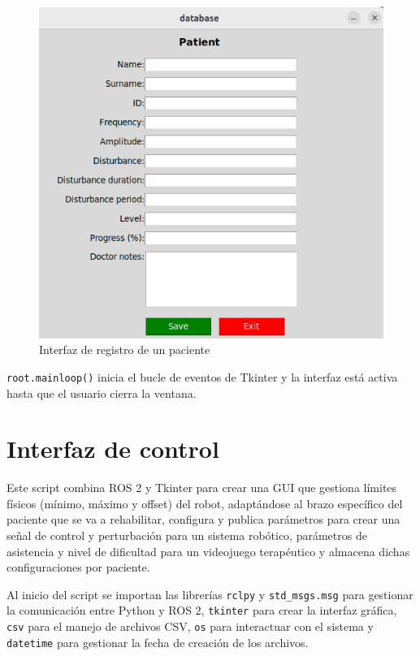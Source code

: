 \begin{figure}[ht!]
	\centering
	\begin{minipage}{0.65\linewidth}
		\centering
		\includegraphics[width=\linewidth]{figs/registro.png}
	\end{minipage}
	\caption[Interfaz de registro de un paciente]{Interfaz de registro de un paciente}
	\label{fig:database}
\end{figure}

\verb|root.mainloop()| inicia el bucle de eventos de Tkinter y la interfaz está activa hasta que el usuario cierra la ventana.

\section{Interfaz de control}
\label{section:controller}

Este script combina ROS 2 y Tkinter para crear una GUI que gestiona límites físicos (mínimo, máximo y offset) del robot, adaptándose al brazo específico del paciente que se va a rehabilitar, configura y publica parámetros para crear una señal de control y perturbación para un sistema robótico, parámetros de asistencia y nivel de dificultad para un videojuego terapéutico y almacena dichas configuraciones por paciente.

Al inicio del script se importan las librerías \verb|rclpy| y \verb|std_msgs.msg| para gestionar la comunicación entre Python y ROS 2, \verb|tkinter| para crear la interfaz gráfica, \verb|csv| para el manejo de archivos CSV, \verb|os| para interactuar con el sistema y \verb|datetime| para gestionar la fecha de creación de los archivos.

